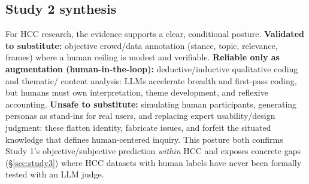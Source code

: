 \subsection{Study 2 synthesis}
For HCC research, the evidence supports a clear, conditional posture.
\textbf{Validated to substitute:} objective crowd/data annotation (stance, topic, relevance, frames) where a human
ceiling is modest and verifiable.
\textbf{Reliable only as augmentation (human-in-the-loop):} deductive/inductive qualitative coding and thematic/
content analysis: LLMs accelerate breadth and first-pass coding, but humans must own interpretation, theme
development, and reflexive accounting.
\textbf{Unsafe to substitute:} simulating human participants, generating personas as stand-ins for real users, and
replacing expert usability/design judgment: these flatten identity, fabricate issues, and forfeit the situated
knowledge that defines human-centered inquiry. This posture both confirms Study 1's objective/subjective prediction
\emph{within} HCC and exposes concrete gaps (\S\ref{sec:study3}) where HCC datasets with human labels have never
been formally tested with an LLM judge.

